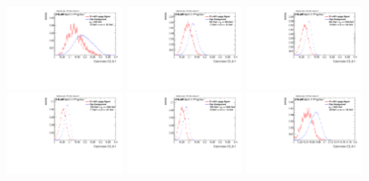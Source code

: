 \begin{figure}[H]
\includegraphics[width=0.3\textwidth]{sascha_input/Appendix/Distributions/w/distributions/beta1/h_recoJet_C2_bin1.pdf} \hspace{1mm}
\includegraphics[width=0.3\textwidth]{sascha_input/Appendix/Distributions/w/distributions/beta1/h_recoJet_C2_bin2.pdf} \hspace{1mm}
\includegraphics[width=0.3\textwidth]{sascha_input/Appendix/Distributions/w/distributions/beta1/h_recoJet_C2_bin3.pdf} 
\bigskip
\includegraphics[width=0.3\textwidth]{sascha_input/Appendix/Distributions/w/distributions/beta1/h_recoJet_C2_bin4.pdf} \hspace{1mm}
\includegraphics[width=0.3\textwidth]{sascha_input/Appendix/Distributions/w/distributions/beta1/h_recoJet_C2_bin5.pdf} \hspace{1mm}
\includegraphics[width=0.3\textwidth]{sascha_input/Appendix/Distributions/w/distributions/beta1/h_recoJet_C2_bin6.pdf}

\end{figure}
